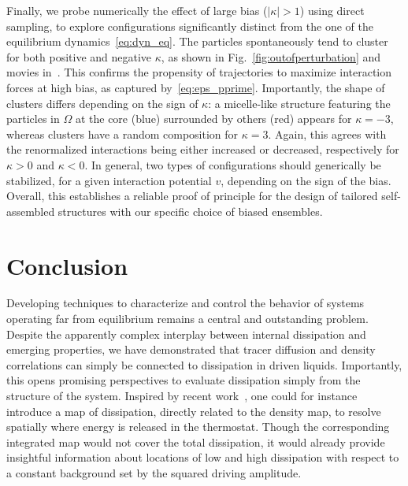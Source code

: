 \documentclass[superscriptaddress, twocolumn, prx, longbibliography, nofootinbib]{revtex4-1}
\begin{document}
Finally, we probe numerically the effect of large bias ($|\kappa|>1$) using direct sampling, to explore configurations significantly distinct from the one of the equilibrium dynamics~\eqref{eq:dyn_eq}. The particles spontaneously tend to cluster for both positive and negative $\kappa$, as shown in Fig.~\ref{fig:outofperturbation} and movies in~\cite{movie}. This confirms the propensity of trajectories to maximize interaction forces at high bias, as captured by~\eqref{eq:eps_pprime}. Importantly, the shape of clusters differs depending on the sign of $\kappa$: a micelle-like structure featuring the particles in $\Omega$ at the core (blue) surrounded by others (red) appears for $\kappa=-3$, whereas clusters have a random composition for $\kappa=3$. Again, this agrees with the renormalized interactions being either increased or decreased, respectively for $\kappa>0$ and $\kappa<0$. In general, two types of configurations should generically be stabilized, for a given interaction potential $v$, depending on the sign of the bias. Overall, this establishes a reliable proof of principle for the design of tailored self-assembled structures with our specific choice of biased ensembles.




\section{Conclusion}

Developing techniques to characterize and control the behavior of systems operating far from equilibrium remains a central and outstanding problem. Despite the apparently complex interplay between internal dissipation and emerging properties, we have demonstrated that tracer diffusion and density correlations can simply be connected to dissipation in driven liquids. Importantly, this opens promising perspectives to evaluate dissipation simply from the structure of the system. Inspired by recent work~\cite{Nardini2017}, one could for instance introduce a map of dissipation, directly related to the density map, to resolve spatially where energy is released in the thermostat. Though the corresponding integrated map would not cover the total dissipation, it would already provide insightful information about locations of low and high dissipation with respect to a constant background set by the squared driving amplitude.
\end{document}
